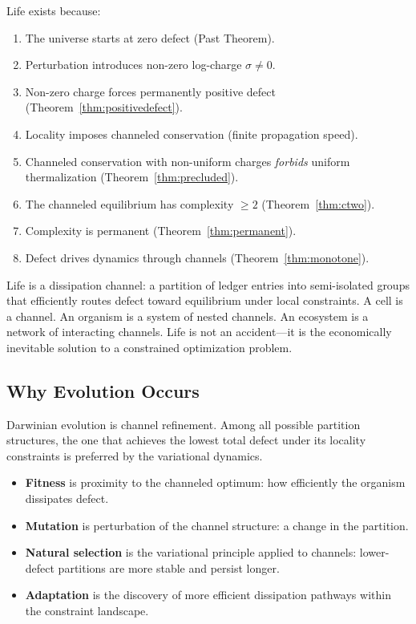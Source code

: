\documentclass[11pt,a4paper]{article}
\theoremstyle{plain}
\theoremstyle{definition}
\theoremstyle{remark}
\begin{document}
Life exists because:
\begin{enumerate}[nosep]
\item The universe starts at zero defect (Past Theorem).
\item Perturbation introduces non-zero log-charge $\sigma \ne 0$.
\item Non-zero charge forces permanently positive defect (Theorem~\ref{thm:positivedefect}).
\item Locality imposes channeled conservation (finite propagation speed).
\item Channeled conservation with non-uniform charges \emph{forbids} uniform thermalization (Theorem~\ref{thm:precluded}).
\item The channeled equilibrium has complexity $\ge 2$ (Theorem~\ref{thm:ctwo}).
\item Complexity is permanent (Theorem~\ref{thm:permanent}).
\item Defect drives dynamics through channels (Theorem~\ref{thm:monotone}).
\end{enumerate}

Life is a dissipation channel: a partition of ledger entries into semi-isolated groups that efficiently routes defect toward equilibrium under local constraints.
A cell is a channel.
An organism is a system of nested channels.
An ecosystem is a network of interacting channels.
Life is not an accident---it is the economically inevitable solution to a constrained optimization problem.

\subsection{Why Evolution Occurs}

Darwinian evolution is channel refinement.
Among all possible partition structures, the one that achieves the lowest total defect under its locality constraints is preferred by the variational dynamics.

\begin{itemize}[nosep]
\item \textbf{Fitness} is proximity to the channeled optimum: how efficiently the organism dissipates defect.
\item \textbf{Mutation} is perturbation of the channel structure: a change in the partition.
\item \textbf{Natural selection} is the variational principle applied to channels: lower-defect partitions are more stable and persist longer.
\item \textbf{Adaptation} is the discovery of more efficient dissipation pathways within the constraint landscape.
\end{itemize}
\end{document}
